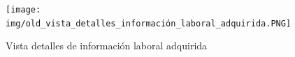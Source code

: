 \documentclass[a4paper, 12pt]{book}
\begin{document}
    \begin{figure}
        \centering
        \texttt{[image: img/old\_vista\_detalles\_información\_laboral\_adquirida.PNG]}
        \caption{Vista detalles de información laboral adquirida}
    \end{figure}



    \cleardoublepage

    
\end{document}
